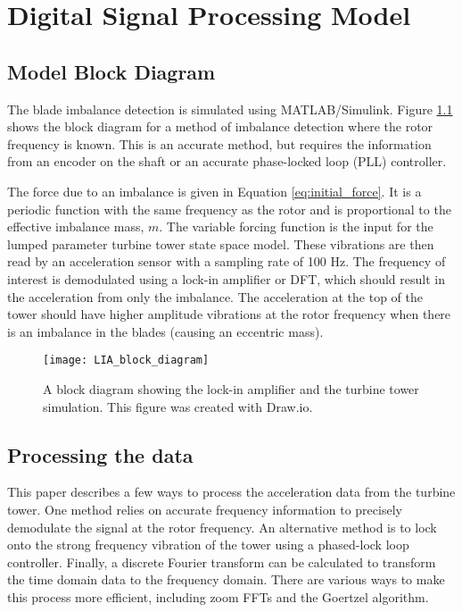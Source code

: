 \chapter{Digital Signal Processing Model} %

\label{ch_dsp_model} 

\section{Model Block Diagram}
The blade imbalance detection is simulated using MATLAB/Simulink.  Figure \ref{fig:LIA_block_diagram} shows the block diagram for a method of imbalance detection where the rotor frequency is known.  This is an accurate method, but requires the information from an encoder on the shaft or an accurate phase-locked loop (PLL) controller.  

The force due to an imbalance is given in Equation \ref{eq:initial_force}.  It is a periodic function with the same frequency as the rotor and is proportional to the effective imbalance mass, $m$.  The variable forcing function is the input for the lumped parameter turbine tower state space model. These vibrations are then read by an acceleration sensor with a sampling rate of 100 Hz.  The frequency of interest is demodulated using a lock-in amplifier or DFT, which should result in the acceleration from only the imbalance.  The acceleration at the top of the tower should have higher amplitude vibrations at the rotor frequency when there is an imbalance in the blades (causing an eccentric mass).

\begin{figure}
	\centering
	\texttt{[image: LIA\_block\_diagram]}
	\decoRule
	\caption{A block diagram showing the lock-in amplifier and the turbine tower simulation.  This figure was created with Draw.io.}
	\label{fig:LIA_block_diagram}
\end{figure}


\section{Processing the data}

This paper describes a few ways to process the acceleration data from the turbine tower.  One method relies on accurate frequency information to precisely demodulate the signal at the rotor frequency.  An alternative method is to lock onto the strong frequency vibration of the tower using a phased-lock loop controller.  Finally, a discrete Fourier transform can be calculated to transform the time domain data to the frequency domain.  There are various ways to make this process more efficient, including zoom FFTs and the Goertzel algorithm.

